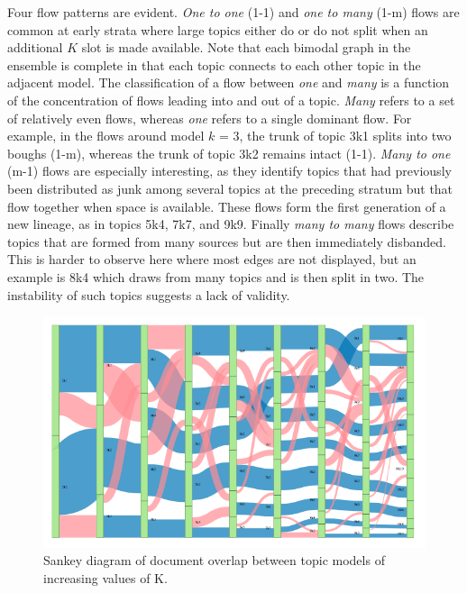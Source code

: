 \documentclass[]{book}
\theoremstyle{definition}
\theoremstyle{definition}
\theoremstyle{definition}
\theoremstyle{remark}
\begin{document}
Four flow patterns are evident. \emph{One to one} (1-1) and \emph{one to
many} (1-m) flows are common at early strata where large topics either
do or do not split when an additional \(K\) slot is made available. Note
that each bimodal graph in the ensemble is complete in that each topic
connects to each other topic in the adjacent model. The classification
of a flow between \emph{one} and \emph{many} is a function of the
concentration of flows leading into and out of a topic. \emph{Many}
refers to a set of relatively even flows, whereas \emph{one} refers to a
single dominant flow. For example, in the flows around model \(k\) = 3,
the trunk of topic 3k1 splits into two boughs (1-m), whereas the trunk
of topic 3k2 remains intact (1-1). \emph{Many to one} (m-1) flows are
especially interesting, as they identify topics that had previously been
distributed as junk among several topics at the preceding stratum but
that flow together when space is available. These flows form the first
generation of a new lineage, as in topics 5k4, 7k7, and 9k9. Finally
\emph{many to many} flows describe topics that are formed from many
sources but are then immediately disbanded. This is harder to observe
here where most edges are not displayed, but an example is 8k4 which
draws from many topics and is then split in two. The instability of such
topics suggests a lack of validity.

\begin{figure}

{\centering \includegraphics[width=1\linewidth]{img/genre-sankey} 

}

\caption{Sankey diagram of document overlap between topic models of increasing values of K.}\label{fig:sankey}
\end{figure}
\end{document}
